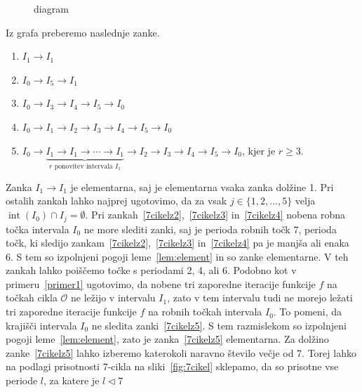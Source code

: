 \documentclass[mat2]{fmfdelo}
\DeclareMathOperator{\interior}{int}
\begin{document}
\begin{primer}[7-cikel]
\begin{figure}[h]
  \caption[Primer vektorske slike.]{diagram}
  \label{fig:6kotnik}
\end{figure}
Iz grafa preberemo naslednje zanke.
\begin{enumerate}
\item $I_1 \to I_1$
\item $I_0 \to I_5 \to I_1$ \label{7cikelz2}
\item $I_0 \to I_3 \to I_4 \to I_5 \to I_0$ \label{7cikelz3}
\item $I_0 \to I_1 \to I_2 \to I_3 \to I_4 \to I_5 \to I_0$ \label{7cikelz4}
\item $I_0 \to \underbrace{I_1 \to I_1 \to \cdots  \to I_1}_{r \text{ ponovitev intervala } I_1} \to I_2 \to I_3 \to I_4 \to I_5 \to I_0$, kjer je $r\geq 3$. \label{7cikelz5}
\end{enumerate}
Zanka $I_1 \to I_1$ je elementarna, saj je elementarna vsaka zanka dolžine 1. Pri ostalih zankah lahko najprej ugotovimo, da za vsak $j \in \{1, 2, \dots, 5\}$ velja $\interior(I_0) \cap I_j = \emptyset$. Pri zankah~\ref{7cikelz2},~\ref{7cikelz3} in~\ref{7cikelz4} nobena robna točka intervala $I_0$ ne more slediti zanki, saj je perioda robnih točk 7, perioda točk, ki sledijo zankam~\ref{7cikelz2},~\ref{7cikelz3} in~\ref{7cikelz4} pa je manjša ali enaka 6. S tem so izpolnjeni pogoji leme~\ref{lem:element} in so zanke elementarne. V teh zankah lahko poiščemo točke s periodami 2, 4, ali 6. Podobno kot v primeru~\ref{primer1} ugotovimo, da nobene tri zaporedne iteracije funkcije $f$ na točkah cikla $\mathcal{O}$ ne ležijo v intervalu $I_1$, zato v tem intervalu tudi ne morejo ležati tri zaporedne iteracije funkcije $f$ na robnih točkah intervala $I_0$. To pomeni, da krajišči intervala $I_0$ ne sledita zanki~\ref{7cikelz5}. S tem razmislekom so izpolnjeni pogoji leme~\ref{lem:element}, zato je zanka~\ref{7cikelz5} elementarna. Za dolžino zanke~\ref{7cikelz5} lahko izberemo katerokoli naravno število večje od 7. Torej lahko na podlagi prisotnosti 7-cikla na sliki~\ref{fig:7cikel} sklepamo, da so prisotne vse periode $l$, za katere je $l \triangleleft 7$
\end{primer}
\end{document}
